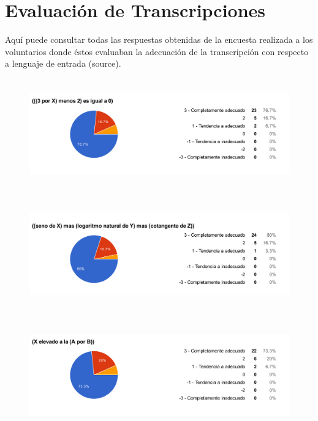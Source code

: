 
\chapter{Evaluación de Transcripciones} %

\label{AppendixA} %

Aquí puede consultar todas las respuestas obtenidas de la encuesta realizada a los voluntarios donde éstos evaluaban la adecuación de la transcripción con respecto a lenguaje de entrada (source).

\begin{figure}[H]
\centering
	\includegraphics[width=15cm, height=4.74cm]{Figures/hjudgement/r1}
	\caption[]{}
\label{fig:parsed_corpus}
\end{figure}

\begin{figure}[H]
\centering
	\includegraphics[width=15cm, height=4.74cm]{Figures/hjudgement/r2}
	\caption[]{}
\label{fig:parsed_corpus}
\end{figure}

\begin{figure}[H]
\centering
	\includegraphics[width=15cm, height=4.74cm]{Figures/hjudgement/r3}
	\caption[]{}
\label{fig:parsed_corpus}
\end{figure}

